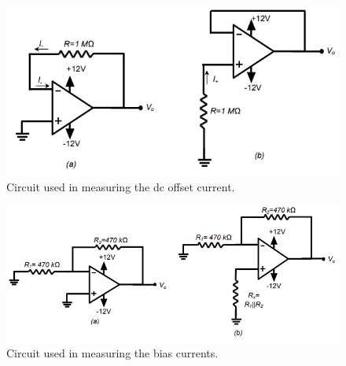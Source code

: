 \documentclass{report}
\begin{document}
\begin{figure}[h]
	\centering
	\includegraphics[width=0.7\linewidth]{exp3b}
	\caption{Circuit used in measuring the dc offset current.}
	\label{fig:exp3b}
\end{figure}
\begin{figure}[h]
	\centering
	\includegraphics[width=0.7\linewidth]{exp3c}
	\caption{Circuit used in measuring the bias currents.}
	\label{fig:exp3c}
\end{figure}
\end{document}
